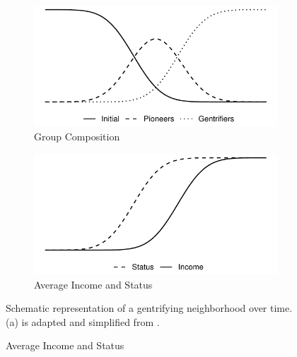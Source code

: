 \documentclass[a4paper,12pt]{article}
\begin{document}
\begin{figure}
\caption{The Gentrifying Neighbourhood over Time}
\begin{subfigure}{.5\textwidth}
  \includegraphics[width=\linewidth]{images/lit_01_stage_groups.pdf}
  \caption{Group Composition}
\end{subfigure}
\hfill
\begin{subfigure}{.5\textwidth}
  \includegraphics[width=\linewidth]{images/lit_01_stage_capital.pdf}
    \caption{Average Income and Status}
\end{subfigure}

\tiny{Schematic representation of a gentrifying neighborhood over time. (a) is adapted and simplified from \citet[70]{dangschatGentrificationHamburg1991}.}

\label{fig:gentri}
\end{figure}
\end{document}
